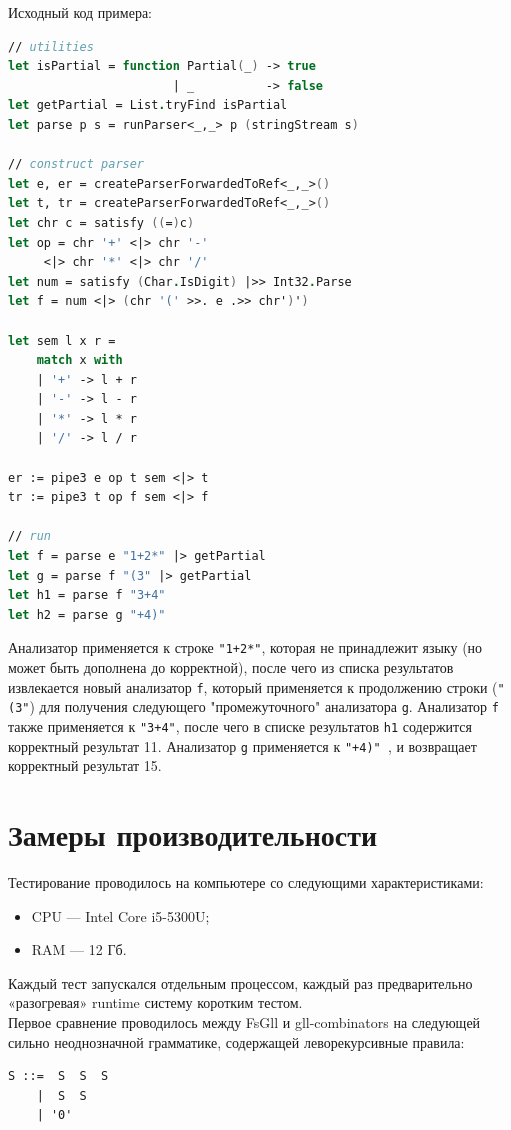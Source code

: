 \documentclass[14pt]{matmex-diploma}
\begin{document}
Исходный код примера:
\begin{lstlisting}[language=FSharp]
// utilities
let isPartial = function Partial(_) -> true 
                       | _          -> false
let getPartial = List.tryFind isPartial
let parse p s = runParser<_,_> p (stringStream s)

// construct parser
let e, er = createParserForwardedToRef<_,_>()
let t, tr = createParserForwardedToRef<_,_>()
let chr c = satisfy ((=)c) 
let op = chr '+' <|> chr '-' 
     <|> chr '*' <|> chr '/'
let num = satisfy (Char.IsDigit) |>> Int32.Parse
let f = num <|> (chr '(' >>. e .>> chr')')

let sem l x r = 
    match x with 
    | '+' -> l + r 
    | '-' -> l - r
    | '*' -> l * r 
    | '/' -> l / r
    
er := pipe3 e op t sem <|> t
tr := pipe3 t op f sem <|> f

// run
let f = parse e "1+2*" |> getPartial 
let g = parse f "(3" |> getPartial
let h1 = parse f "3+4"
let h2 = parse g "+4)"
\end{lstlisting}

Анализатор применяется к строке {\tt "1+2*"}, которая не принадлежит языку 
  (но может быть дополнена до корректной), после чего из списка результатов 
  извлекается новый анализатор {\tt f}, который применяется к продолжению строки 
  ({\tt "(3"}) для получения следующего "промежуточного" анализатора {\tt g}. Анализатор {\tt f} также
  применяется к {\tt "3+4"}, после чего в списке результатов {\tt h1} содержится корректный
  результат 11. Анализатор {\tt g} применяется к {\tt "+4)" }, и возвращает корректный результат 15.






\section{Замеры производительности}

Тестирование проводилось на компьютере со следующими характеристиками:
\begin{itemize}
    \item CPU --- Intel Core i5-5300U;
    \item RAM --- 12 Гб.
\end{itemize}
Каждый тест запускался отдельным процессом, каждый раз предварительно «разогревая» runtime 
систему коротким тестом.\\

Первое сравнение проводилось между FsGll и gll-combinators на следующей 
сильно неоднозначной грамматике, содержащей леворекурсивные правила: 
\begin{lstlisting}
S ::=  S  S  S 
    |  S  S 
    | '0'
\end{lstlisting}
\end{document}
